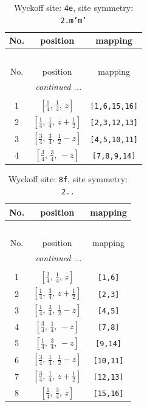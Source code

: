 \documentclass[fleqn,8pt]{jsarticle}
\begin{document}
\renewcommand{\arraystretch}{1.2}
\begin{longtable}{ccc}
\caption{Wyckoff site: {\tt 4e}, site symmetry: {\tt 2.m'm'}}
 \\
 \hline \hline
No. & position & mapping \\ \hline \endfirsthead

\multicolumn{2}{l}{\tablename\ \thetable{}} \\
 \hline \hline
No. & position & mapping \\ \hline \endhead

 \hline \hline
\multicolumn{2}{r}{\footnotesize\it continued ...} \\ \endfoot

 \hline \hline
\multicolumn{2}{r}{} \\ \endlastfoot

1 & $\left[ \frac{1}{4},\, \frac{1}{4},\, z \right]$ & {\tt [1,6,15,16]} \\ \hline
2 & $\left[ \frac{1}{4},\, \frac{1}{4},\, z + \frac{1}{2} \right]$ & {\tt [2,3,12,13]} \\ \hline
3 & $\left[ \frac{3}{4},\, \frac{3}{4},\, \frac{1}{2} - z \right]$ & {\tt [4,5,10,11]} \\ \hline
4 & $\left[ \frac{3}{4},\, \frac{3}{4},\, - z \right]$ & {\tt [7,8,9,14]} \\
\end{longtable}
\renewcommand{\arraystretch}{1.2}
\begin{longtable}{ccc}
\caption{Wyckoff site: {\tt 8f}, site symmetry: {\tt 2..}}
 \\
 \hline \hline
No. & position & mapping \\ \hline \endfirsthead

\multicolumn{2}{l}{\tablename\ \thetable{}} \\
 \hline \hline
No. & position & mapping \\ \hline \endhead

 \hline \hline
\multicolumn{2}{r}{\footnotesize\it continued ...} \\ \endfoot

 \hline \hline
\multicolumn{2}{r}{} \\ \endlastfoot

1 & $\left[ \frac{3}{4},\, \frac{1}{4},\, z \right]$ & {\tt [1,6]} \\ \hline
2 & $\left[ \frac{1}{4},\, \frac{3}{4},\, z + \frac{1}{2} \right]$ & {\tt [2,3]} \\ \hline
3 & $\left[ \frac{1}{4},\, \frac{3}{4},\, \frac{1}{2} - z \right]$ & {\tt [4,5]} \\ \hline
4 & $\left[ \frac{3}{4},\, \frac{1}{4},\, - z \right]$ & {\tt [7,8]} \\ \hline
5 & $\left[ \frac{1}{4},\, \frac{3}{4},\, - z \right]$ & {\tt [9,14]} \\ \hline
6 & $\left[ \frac{3}{4},\, \frac{1}{4},\, \frac{1}{2} - z \right]$ & {\tt [10,11]} \\ \hline
7 & $\left[ \frac{3}{4},\, \frac{1}{4},\, z + \frac{1}{2} \right]$ & {\tt [12,13]} \\ \hline
8 & $\left[ \frac{1}{4},\, \frac{3}{4},\, z \right]$ & {\tt [15,16]} \\
\end{longtable}
\end{document}
